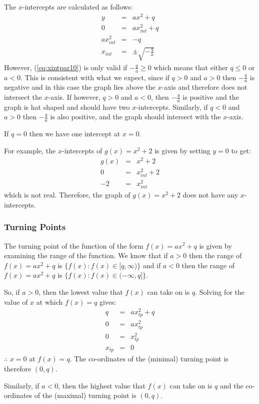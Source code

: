 \documentclass[10pt,a4paper,titlepage,twoside,openright]{report}
\begin{document}
The $x$-intercepts are calculated as follows:
\begin{eqnarray}
y&=&ax^2+q\\
0&=&a x_{int}^2+q\\
a x_{int}^2&=&-q\\
\label{eq:xintpar10}
x_{int}&=&\pm \sqrt{-\frac{q}{a}}
\end{eqnarray}
However, (\ref{eq:xintpar10}) is only valid if $-\frac{q}{a} \geq 0$ which means that either $q \leq 0$ or $a<0$. This is consistent with what we expect, since if $q>0$ and $a>0$ then $-\frac{q}{a}$ is negative and in this case the graph lies above the $x$-axis and therefore does not intersect the $x$-axis. If however, $q>0$ and $a<0$, then $-\frac{q}{a}$ is positive and the graph is hat shaped and should have two $x$-intercepts. Similarly, if $q<0$ and $a>0$ then $-\frac{q}{a}$ is also positive, and the graph should intersect with the $x$-axis.

If $q=0$ then we have one intercept at $x=0$.

For example, the $x$-intercepts of $g(x)=x^2 + 2$ is given by setting $y=0$ to get:
\begin{eqnarray*}
g(x)&=&x^2 + 2\\
0&=&x_{int}^2 + 2\\
-2&=&x_{int}^2
\end{eqnarray*}
which is not real. Therefore, the graph of $g(x)=x^2 + 2$ does not have any $x$-intercepts.

\subsubsection{Turning Points}
The turning point of the function of the form $f(x)=ax^2+q$ is given by examining the range of the function. We know that if $a>0$ then the range of $f(x)=ax^2+q$ is $\{f(x):f(x)\in[q,\infty)\}$ and if $a<0$ then the range of $f(x)=ax^2+q$ is $\{f(x):f(x)\in(-\infty,q]\}$.

So, if $a>0$, then the lowest value that $f(x)$ can take on is $q$. Solving for the value of $x$ at which $f(x)=q$ gives:
\begin{eqnarray*}
q&=&ax_{tp}^2+q\\
0&=&ax_{tp}^2\\
0&=&x_{tp}^2\\
x_{tp}&=&0
\end{eqnarray*}
$\therefore$ $x=0$ at $f(x)=q$. The co-ordinates of the (minimal) turning point is therefore $(0,q)$.

Similarly, if $a<0$, then the highest value that $f(x)$ can take on is $q$ and the co-ordinates of the (maximal) turning point is $(0,q)$.
\end{document}
